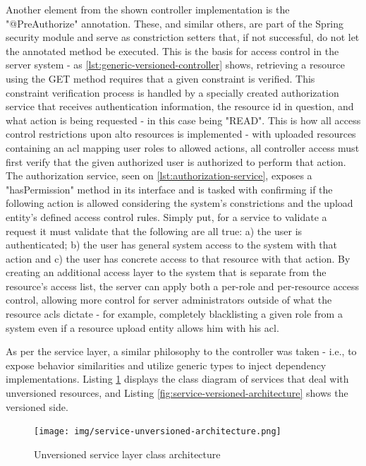     Another element from the shown controller implementation is the "@PreAuthorize" annotation.
    These, and similar others, are part of the Spring security module and serve as constriction setters that, if not successful, do not let the annotated method be executed.
    This is the basis for access control in the server system - as \ref{lst:generic-versioned-controller} shows, retrieving a resource using the GET method requires that a given constraint is verified.
    This constraint verification process is handled by a specially created authorization service that receives authentication information, the resource id in question, and what action is being requested - in this case being "READ".
    This is how all access control restrictions upon \gls{alto} resources is implemented - with uploaded resources containing an \gls{acl} mapping user roles to allowed actions, all controller access must first verify that the given authorized user is authorized to perform that action.
    The authorization service, seen on \ref{lst:authorization-service}, exposes a "hasPermission" method in its interface and is tasked with confirming if the following action is allowed considering the system's constrictions and the upload entity's defined access control rules.
    Simply put, for a service to validate a request it must validate that the following are all true: a) the user is authenticated; b) the user has general system access to the system with that action and c) the user has concrete access to that resource with that action.
    By creating an additional access layer to the system that is separate from the resource's access list, the server can apply both a per-role and per-resource access control, allowing more control for server administrators outside of what the resource \gls{acls} dictate - for example, completely blacklisting a given role from a system even if a resource upload entity allows him with his \gls{acl}.

    As per the service layer, a similar philosophy to the controller was taken - i.e., to expose behavior similarities and utilize generic types to inject dependency implementations.
    Listing \ref{fig:service-unversioned-architecture} displays the class diagram of services that deal with unversioned resources, and Listing \ref{fig:service-versioned-architecture} shows the versioned side.

\begin{figure}[ht]
\centering
\texttt{[image: img/service-unversioned-architecture.png]}
\label{fig:service-unversioned-architecture}
\caption{Unversioned service layer class architecture}
\end{figure}

